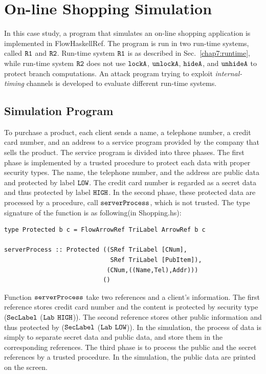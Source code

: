 \documentclass{report}
\newcommand{\co}[1]{$\cod{#1}$}
\begin{document}
\section{On-line Shopping Simulation}
\label{chap8:shopping}
In this case study, a program that simulates an on-line shopping application is implemented in FlowHaskellRef.
The program is run in two run-time systems, called \co{R1} and \co{R2}. Run-time system \co{R1} is 
as described in Sec.~\ref{chap7:runtime}, while run-time system \co{R2} does not use \co{lockA}, \co{unlockA},
\co{hideA}, and \co{unhideA} to protect branch computations. An attack program trying to exploit
{\em internal-timing} channels is developed to evaluate different run-time systems.

\subsection{Simulation Program}
To purchase a product, each client sends a name, a telephone number, a credit card number, and an address to
a service program provided by the company that sells the product. The service program is divided into
three phases. The first phase is implemented by a trusted procedure to protect each data with proper
security types. The name, the telephone number, and the address are public data and protected by label \co{LOW}. 
The credit card number is regarded as a secret data and thus protected by label \co{HIGH}. 
In the second phase, these protected data are processed by a procedure, call \co{serverProcess},
which is not trusted. The type signature of the function is as following(in Shopping.hs):
\begin{Verbatim}[fontsize=\small]
type Protected b c = FlowArrowRef TriLabel ArrowRef b c

serverProcess :: Protected ((SRef TriLabel [CNum], 
                             SRef TriLabel [PubItem]),
                            (CNum,((Name,Tel),Addr)))
                           ()
\end{Verbatim}
Function \co{serverProcess} take two references and a client's information. The first reference stores
credit card number and the content is protected by security type (\co{SecLabel} (\co{Lab} \co{HIGH})). 
The second reference stores other public information and thus protected by
(\co{SecLabel} (\co{Lab} \co{LOW})).
In the simulation, the process of data is simply to separate secret data and public data, 
and store them in the corresponding references.
The third phase is to process the public and the secret references by a trusted procedure.
In the simulation, the public data are printed on the screen.
\end{document}
